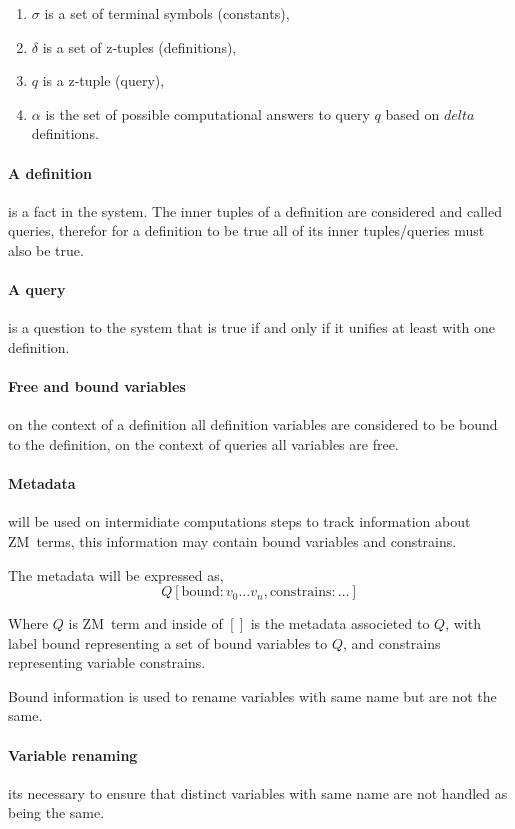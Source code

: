 \documentclass[11pt,a4paper]{report}
\newcommand{\zm}{ZM}
\begin{document}
\begin{enumerate}
\item $\sigma$ is a set of terminal symbols (constants),
\item $\delta$ is a set of z-tuples (definitions),
\item $q$ is a z-tuple (query),
\item $\alpha$ is the set of possible computational answers to query $q$ based on $delta$ definitions.
\end{enumerate}


\paragraph{A definition} is a fact in the system. The inner tuples of a definition are considered and called queries, therefor 
for a definition to be true all of its inner tuples/queries must also be true.

\paragraph{A query} is a question to the system that is true if and only if it unifies at least with 
one definition.

\paragraph{Free and bound variables} on the context of a definition all definition variables are considered 
to be bound to the definition, on the context of queries all variables are free.

\paragraph{Metadata} will be used on intermidiate computations steps to track information about \zm\ terms, 
this information may contain bound variables and constrains.

The metadata will be expressed as,
\[
    Q[\text{bound}: v_{0} \ldots v_{n}, \text{constrains}: \ldots ]
\]

Where $Q$ is \zm\ term and inside of $[]$ is the metadata associeted to $Q$, with label bound representing a set of bound variables to $Q$, and constrains representing 
variable constrains.


Bound information is used to rename variables with same name but are not the same.

\paragraph{Variable renaming} its necessary to ensure that distinct variables with same name are not handled as being the same.
\end{document}
